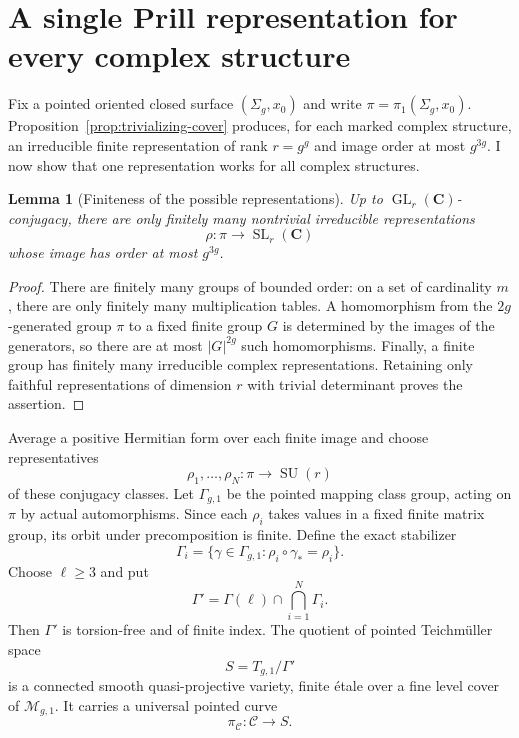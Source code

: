 \documentclass[11pt,reqno]{amsart}
\numberwithin{equation}{section}
\newtheorem{lemma}[theorem]{Lemma}
\theoremstyle{definition}
\theoremstyle{remark}
\newcommand{\C}{\mathbf C}
\newcommand{\cM}{\mathcal M}
\newcommand{\SU}{\operatorname{SU}}
\newcommand{\GL}{\operatorname{GL}}
\newcommand{\SL}{\operatorname{SL}}
\begin{document}
\section{A single Prill representation for every complex structure}\label{sec:uniform}

Fix a pointed oriented closed surface $(\Sigma_g,x_0)$ and write
$\pi=\pi_1(\Sigma_g,x_0)$.  Proposition~\ref{prop:trivializing-cover} produces, for each marked complex structure, an irreducible finite representation of rank $r=g^g$ and image order at most $g^{3g}$.  I now show that one representation works for all complex structures.

\begin{lemma}[Finiteness of the possible representations]\label{lem:finite-reps}
Up to $\GL_r(\C)$-conjugacy, there are only finitely many nontrivial irreducible representations
\[
\rho:\pi\longrightarrow\SL_r(\C)
\]
whose image has order at most $g^{3g}$.
\end{lemma}

\begin{proof}
There are finitely many groups of bounded order: on a set of cardinality $m$, there are only finitely many multiplication tables.  A homomorphism from the $2g$-generated group $\pi$ to a fixed finite group $G$ is determined by the images of the generators, so there are at most $|G|^{2g}$ such homomorphisms.  Finally, a finite group has finitely many irreducible complex representations.  Retaining only faithful representations of dimension $r$ with trivial determinant proves the assertion.
\end{proof}

Average a positive Hermitian form over each finite image and choose representatives
\begin{equation}\label{eq:finite-list}
\rho_1,\ldots,\rho_N:\pi\longrightarrow\SU(r)
\end{equation}
of these conjugacy classes.  Let $\Gamma_{g,1}$ be the pointed mapping class group, acting on $\pi$ by actual automorphisms.  Since each $\rho_i$ takes values in a fixed finite matrix group, its orbit under precomposition is finite.  Define the exact stabilizer
\[
\Gamma_i=
\{\gamma\in\Gamma_{g,1}:\rho_i\circ\gamma_*=\rho_i\}.
\]
Choose $\ell\ge3$ and put
\begin{equation}\label{eq:exact-level}
\Gamma'=\Gamma(\ell)\cap\bigcap_{i=1}^N\Gamma_i.
\end{equation}
Then $\Gamma'$ is torsion-free and of finite index.  The quotient of pointed Teichm\"uller space
\[
S=T_{g,1}/\Gamma'
\]
is a connected smooth quasi-projective variety, finite \'etale over a fine level cover of $\cM_{g,1}$.  It carries a universal pointed curve
\begin{equation}\label{eq:universal-curve}
\pi_{\mathcal C}:\mathcal C\longrightarrow S.
\end{equation}
\end{document}
